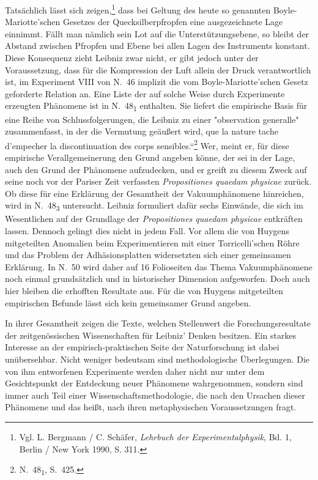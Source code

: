 Tats\"{a}chlich l\"{a}sst sich zeigen,\footnote{\footnotesize Vgl. L. Bergmann / C. Sch\"{a}fer, \textit{Lehrbuch der Experimentalphysik}, Bd. 1, Berlin / New York 1990, S. 311.} dass bei Geltung des heute so genannten Boyle-Mariotte'schen Gesetzes der Quecksilberpfropfen eine ausgezeichnete Lage einnimmt. F\"{a}llt man n\"{a}mlich sein Lot auf die Unterst\"{u}tzungsebene, so bleibt der Abstand zwischen Pfropfen und Ebene bei allen Lagen des Instruments konstant. Diese Konsequenz zieht Leibniz zwar nicht, er gibt jedoch unter der Voraussetzung, dass f\"{u}r die Kompression der Luft allein der Druck verantwortlich ist, im Experiment VIII von N.~46 implizit die vom Boyle-Mariotte'schen Gesetz geforderte Relation an.
Eine Liste der auf solche Weise durch Experimente erzeugten Ph\"{a}nomene ist in N.~48\textsubscript{1} enthalten. Sie liefert die empirische Basis f\"{u}r eine Reihe von Schlussfolgerungen, die Leibniz zu einer "observation generalle" zusammen\-fasst, in der die Vermutung ge\"{a}u{\ss}ert wird, \glqq [...] que la nature tache d'empecher la discontinuation des corps sensibles.``\footnote{\footnotesize N.~48\textsubscript{1}, S.~425.} Wer, meint er, f\"{u}r diese empirische Ver\-allgemeinerung den Grund angeben k\"{o}nne, der sei in der Lage, auch den Grund der Ph\"{a}nomene aufzudecken, und er greift zu diesem Zweck auf seine noch vor der Pariser Zeit verfassten \textit{Propositiones quaedam physicae} zur\"{u}ck. Ob diese f\"{u}r eine Erkl\"{a}rung der Gesamtheit der Vakuumph\"{a}nomene hinreichen, wird in N.~48\textsubscript{3} untersucht. Leibniz formuliert daf\"{u}r sechs Einw\"{a}nde, die sich im Wesentlichen auf der Grundlage der \textit{Propositiones quaedam physicae} entkr\"{a}ften lassen. Dennoch gelingt dies nicht in jedem Fall. Vor allem die von Huygens mitgeteilten Anomalien beim Experimentieren mit einer Torricelli'schen R\"{o}hre und das Problem der Adh\"{a}sionsplatten widersetzten sich einer gemeinsamen Erkl\"{a}rung. In N.~50 wird daher auf 16 Folioseiten das Thema Vakuumph\"{a}nomene noch einmal grunds\"{a}tzlich und in historischer Dimension aufgeworfen. Doch auch hier bleiben die erhofften Resultate aus. F\"{u}r die von Huygens mitgeteilten empirischen Befunde l\"{a}sst sich kein gemeinsamer Grund angeben.\par
In ihrer Gesamtheit zeigen die Texte, welchen Stellenwert die Forschungs\-resultate der zeitgen\"{o}ssischen Wissenschaften f\"{u}r Leibniz' Denken besitzen. Ein star\-kes Interesse an der empirisch-praktischen Seite der Naturforschung ist dabei un\"{u}bersehbar. Nicht weniger bedeutsam sind methodologische \"{U}berlegungen. Die von ihm entworfenen Experimente werden daher nicht nur unter dem Gesichts\-punkt der Entdeckung neuer Ph\"{a}nomene wahrgenommen, sondern sind immer auch Teil einer Wissenschaftsmethodologie, die nach den Ursachen dieser Ph\"{a}nomene und das hei{\ss}t, nach ihren metaphysischen Voraussetzungen fragt.\par
